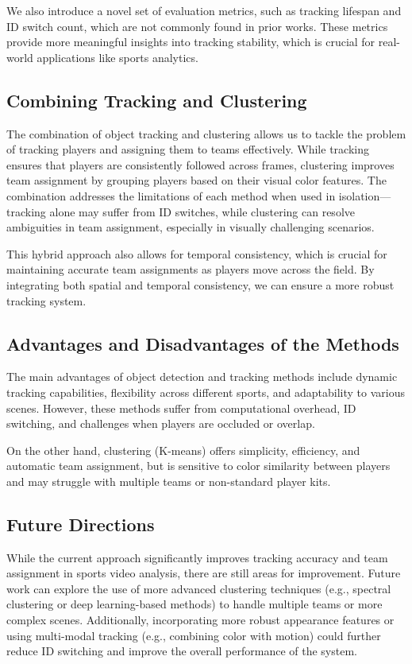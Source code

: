 We also introduce a novel set of evaluation metrics, such as tracking lifespan and ID switch count, which are not commonly found in prior works. These metrics provide more meaningful insights into tracking stability, which is crucial for real-world applications like sports analytics.

\subsection{Combining Tracking and Clustering}

The combination of object tracking and clustering allows us to tackle the problem of tracking players and assigning them to teams effectively. While tracking ensures that players are consistently followed across frames, clustering improves team assignment by grouping players based on their visual color features. The combination addresses the limitations of each method when used in isolation—tracking alone may suffer from ID switches, while clustering can resolve ambiguities in team assignment, especially in visually challenging scenarios.

This hybrid approach also allows for temporal consistency, which is crucial for maintaining accurate team assignments as players move across the field. By integrating both spatial and temporal consistency, we can ensure a more robust tracking system.

\subsection{Advantages and Disadvantages of the Methods}

The main advantages of object detection and tracking methods include dynamic tracking capabilities, flexibility across different sports, and adaptability to various scenes. However, these methods suffer from computational overhead, ID switching, and challenges when players are occluded or overlap.

On the other hand, clustering (K-means) offers simplicity, efficiency, and automatic team assignment, but is sensitive to color similarity between players and may struggle with multiple teams or non-standard player kits.

\subsection{Future Directions}

While the current approach significantly improves tracking accuracy and team assignment in sports video analysis, there are still areas for improvement. Future work can explore the use of more advanced clustering techniques (e.g., spectral clustering or deep learning-based methods) to handle multiple teams or more complex scenes. Additionally, incorporating more robust appearance features or using multi-modal tracking (e.g., combining color with motion) could further reduce ID switching and improve the overall performance of the system.

